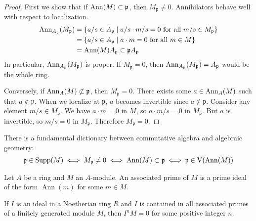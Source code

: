 \documentclass[12pt]{article}
\begin{document}
\begin{proof}
    First we show that if $\operatorname{Ann}(M) \subset \mathfrak{p}$, then $M_{\mathfrak{p}} \neq 0$. Annihilators behave well with respect to localization. \begin{align*}
        \operatorname{Ann}_{A_{\mathfrak{p}}}(M_{\mathfrak{p}}) & = \{a/s \in A_{\mathfrak{p}} \mid a/s \cdot m/s = 0 \text{ for all } m/s \in M_{\mathfrak{p}}\} \\
                                                  & = \{a/s \in A_{\mathfrak{p}} \mid a \cdot m = 0 \text{ for all } m \in M\}                      \\
                                                  & = \operatorname{Ann}(M)A_{\mathfrak{p}} \subset \mathfrak{p}A_{\mathfrak{p}}
    \end{align*} In particular, $\operatorname{Ann}_{A_{\mathfrak{p}}}(M_{\mathfrak{p}})$ is proper. If $M_{\mathfrak{p}} = 0$, then $\operatorname{Ann}_{A_{\mathfrak{p}}}(M_{\mathfrak{p}}) = A_{\mathfrak{p}}$ would be the whole ring.

    Conversely, if $\operatorname{Ann}_A(M) \not\subset \mathfrak{p}$, then $M_{\mathfrak{p}} = 0$. There exists some $a \in \operatorname{Ann}_A(M)$ such that $a \not\in \mathfrak{p}$. When we localize at $\mathfrak{p}$, $a$ becomes invertible since $a \not\in \mathfrak{p}$. Consider any element $m/s\in M_{\mathfrak{p}}$. We have $a \cdot m = 0$ in $M$, so $a \cdot m/s = 0$ in $M_{\mathfrak{p}}$. But $a$ is invertible, so $m/s = 0$ in $M_{\mathfrak{p}}$. Therefore $M_{\mathfrak{p}} = 0$.
\end{proof}

\begin{remark}
    There is a fundamental dictionary between commutative algebra and algebraic geometry:
    \begin{align*}
        \mathfrak{p} \in \operatorname{Supp}(M) \iff M_{\mathfrak{p}} \neq 0 \iff \operatorname{Ann}(M) \subset \mathfrak{p} \iff \mathfrak{p} \in \operatorname{V}(\operatorname{Ann}(M))
    \end{align*}
\end{remark}

\begin{definition}
     Let $A$ be a ring and $M$ an $A$-module. An associated prime of $M$ is a prime ideal of the form $\operatorname{Ann}(m)$ for some $m \in M$.
\end{definition}


\begin{theorem}\label{thm:associated_primes}
    If $I$ is an ideal in a Noetherian ring $R$ and $I$ is contained in all associated primes of a finitely generated module $M$, then $I^n M = 0$ for some positive integer $n$.
\end{theorem}
\end{document}
